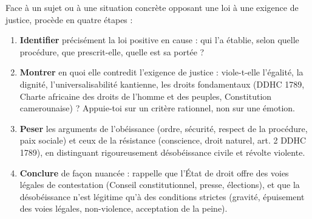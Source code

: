 \documentclass[11pt]{article}
\begin{document}
\begin{methode}
Face à un sujet ou à une situation concrète opposant une loi à une exigence de justice, procède en quatre étapes :
\begin{enumerate}
\item \textbf{Identifier} précisément la loi positive en cause : qui l'a établie, selon quelle procédure, que prescrit-elle, quelle est sa portée ?
\item \textbf{Montrer} en quoi elle contredit l'exigence de justice : viole-t-elle l'égalité, la dignité, l'universalisabilité kantienne, les droits fondamentaux (DDHC 1789, Charte africaine des droits de l'homme et des peuples, Constitution camerounaise) ? Appuie-toi sur un critère rationnel, non sur une émotion.
\item \textbf{Peser} les arguments de l'obéissance (ordre, sécurité, respect de la procédure, paix sociale) et ceux de la résistance (conscience, droit naturel, art. 2 DDHC 1789), en distinguant rigoureusement désobéissance civile et révolte violente.
\item \textbf{Conclure} de façon nuancée : rappelle que l'État de droit offre des voies légales de contestation (Conseil constitutionnel, presse, élections), et que la désobéissance n'est légitime qu'à des conditions strictes (gravité, épuisement des voies légales, non-violence, acceptation de la peine).
\end{enumerate}
\end{methode}
\end{document}
